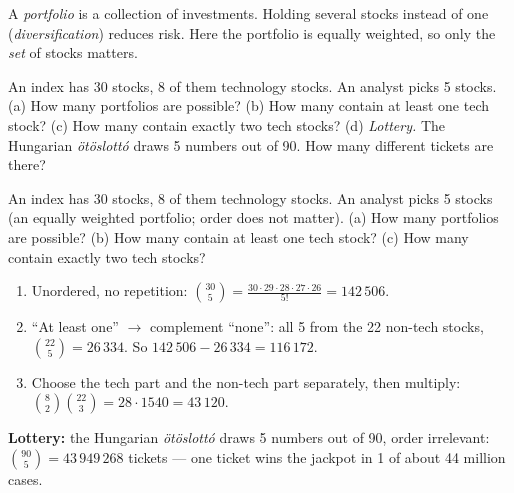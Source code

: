 
\begin{problem}
	\begin{context}
		A \emph{portfolio} is a collection of investments. Holding several
		stocks instead of one (\emph{diversification}) reduces risk. Here the
		portfolio is equally weighted, so only the \emph{set} of stocks matters.
	\end{context}
	An index has 30 stocks, 8 of them technology stocks. An analyst picks 5
	stocks. (a) How many portfolios are possible? (b) How many contain at least
	one tech stock? (c) How many contain exactly two tech stocks?
	(d) \emph{Lottery.} The Hungarian \emph{ötöslottó} draws 5 numbers out of
	90. How many different tickets are there?
\end{problem}

\begin{slideproblem}
	An index has 30 stocks, 8 of them technology stocks. An analyst
	picks 5 stocks (an equally weighted portfolio; order does not matter).
	(a) How many portfolios are possible?
	(b) How many contain at least one tech stock?
	(c) How many contain exactly two tech stocks?
\end{slideproblem}

\begin{slides}
	\small
	\exstatement
	\pause
	\sol
	\begin{enumerate}
		\item[(a)] Unordered, no repetition: $\binom{30}{5} =
			      \frac{30\cdot29\cdot28\cdot27\cdot26}{5!} = 142\,506$.
		\item[(b)] ``At least one'' $\to$ complement ``none'': all 5 from the 22
		      non-tech stocks, $\binom{22}{5}=26\,334$. So
		      $142\,506-26\,334 = 116\,172$.
		\item[(c)] Choose the tech part and the non-tech part separately, then
		      multiply: $\binom82\binom{22}{3} = 28\cdot1540 = 43\,120$.
	\end{enumerate}
	\pause
	\textbf{Lottery:} the Hungarian \emph{ötöslottó} draws 5 numbers out of 90,
	order irrelevant: $\binom{90}{5} = 43\,949\,268$ tickets --- one ticket wins
	the jackpot in 1 of about 44 million cases.
\end{slides}

